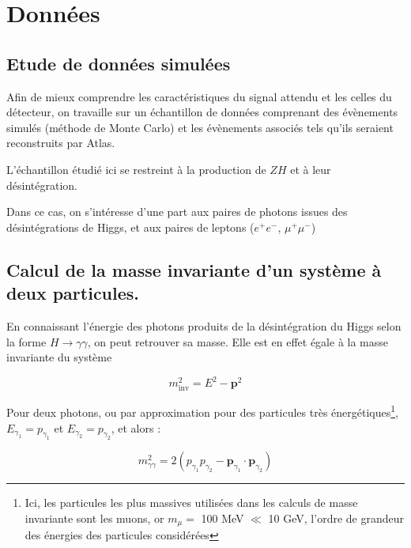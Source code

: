 \documentclass[11pt]{article} %
\begin{document}

\section{Données}

\subsection{Etude de données simulées}

Afin de mieux comprendre les caractéristiques du signal attendu et les celles du détecteur, on travaille sur un échantillon de données comprenant des évènements simulés (méthode de Monte Carlo) et les évènements associés tels qu'ils seraient reconstruits par Atlas.

L'échantillon étudié ici se restreint à la production de $ZH$ et à leur désintégration.

Dans ce cas, on s'intéresse d'une part aux paires de photons issues des désintégrations de Higgs, et aux paires de leptons ($e^+e^-$, $\mu^+\mu^-$)


\subsection{Calcul de la masse invariante d'un système à deux particules.}

En connaissant l'énergie des photons produits de la désintégration du Higgs selon la forme $H\to \gamma \gamma$, on peut retrouver sa masse. Elle est en effet égale à la masse invariante du système 

\begin{equation}
m_{\textrm{inv}}^2 = E^2 - \textbf{p}^2
\end{equation}

Pour deux photons,  ou par approximation pour des particules très énergétiques\footnote{Ici, les particules les plus massives utilisées dans les calculs de masse invariante sont les muons, or $m_\mu = $ 100 MeV $\ll $ 10 GeV, l'ordre de grandeur des énergies des particules considérées}, $E_{\gamma_1} = p_{\gamma_1}$ et $E_{\gamma_2} = p_{\gamma_2}$, et alors :

\begin{equation}
m_{\gamma \gamma}^2 = 2 \left ( p_{\gamma_1} p_{\gamma_2} - \textbf{p}_{\gamma_1} \cdot \textbf{p}_{\gamma_2} \right )
\end{equation}
\end{document}
